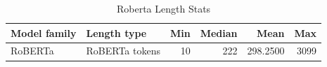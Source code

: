 \begin{table}
\caption{Roberta Length Stats}
\label{tab:roberta_length_stats}
\begin{tabular}{llrrrr}
\toprule
Model family & Length type & Min & Median & Mean & Max \\
\midrule
RoBERTa & RoBERTa tokens & 10 & 222 & 298.2500 & 3099 \\
\bottomrule
\end{tabular}
\end{table}

